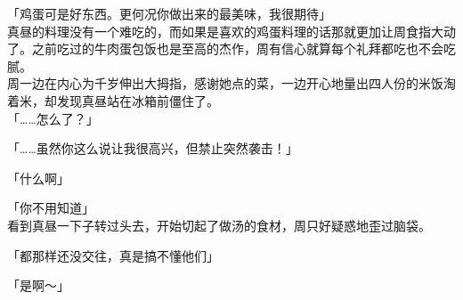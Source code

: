 「鸡蛋可是好东西。更何况你做出来的最美味，我很期待」\\

真昼的料理没有一个难吃的，而如果是喜欢的鸡蛋料理的话那就更加让周食指大动了。之前吃过的牛肉蛋包饭也是至高的杰作，周有信心就算每个礼拜都吃也不会吃腻。\\

周一边在内心为千岁伸出大拇指，感谢她点的菜，一边开心地量出四人份的米饭淘着米，却发现真昼站在冰箱前僵住了。\\

「……怎么了？」

「……虽然你这么说让我很高兴，但禁止突然袭击！」

「什么啊」

「你不用知道」\\

看到真昼一下子转过头去，开始切起了做汤的食材，周只好疑惑地歪过脑袋。\\

\vspace{2\baselineskip}

「都那样还没交往，真是搞不懂他们」

「是啊～」
